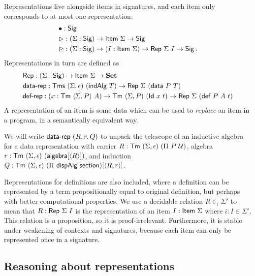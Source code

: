 Representations live alongside items in signatures, and each item only corresponds
to at most one representation:
\begin{align*}
	 & \bullet : \Sig \\
	 & \rhd : (\Sigma : \Sig) \to \Item\ \Sigma \to \Sig \\
	 & \unrhd : (\Sigma : \Sig) \to (I : \Item\ \Sigma) \to \Rep\ \Sigma\ I \to \Sig \,.
\end{align*}
Representations in turn are defined as
\begin{align*}
& \Rep : (\Sigma : \Sig) \to \Item\ \Sigma \to \Set \\
& \mta{data-rep} : \Tms\ (\Sigma, \epsilon)\ (\mta{indAlg}\ T) \to \Rep\ \Sigma\ (\mta{data}\ P\ T) \\
& \mta{def-rep} : (x : \Tm\ (\Sigma, P)\ A) \to \Tm\ (\Sigma, P)\ (\mta{Id}\ x\ t) \to \Rep\ \Sigma\ (\mta{def}\ P\ A\ t)
\end{align*}
A representation of an item is some data which can be used to \emph{replace}
an item in a program, in a semantically equivalent way.

We will write $\textsf{data-rep}\ (R, r, Q)$ to unpack the telescope of an
inductive algebra for a data representation with carrier $R : \textsf{Tm}\ (\Sigma,
\epsilon)\ (\Pi\ P\ \mathcal{U})$, algebra $r : \textsf{Tm}\ (\Sigma, \epsilon)\
(\textsf{algebra}[\langle R\rangle])$, and induction $Q : \textsf{Tm}\ (\Sigma, \epsilon)\ (\Pi\
\textsf{dispAlg}\ \textsf{section})[\langle R, r\rangle]$.

Representations for definitions are also included, where a definition can be
represented by a term propositionally equal to original definition, but perhaps
with better computational properties.
We use a decidable relation $R \in_i \Sigma'$ to mean that $R :
\textsf{Rep}\ \Sigma\ I$ is the representation of an item $I : \textsf{Item}\ \Sigma$
where $i : I \in \Sigma'$.
This relation is a proposition, so it is proof-irrelevant. Furthermore, it is stable under
weakening of contexts and signatures, because each item can only be represented once in a signature.


\subsection{Reasoning about representations} \label{sub:lambdarep}

